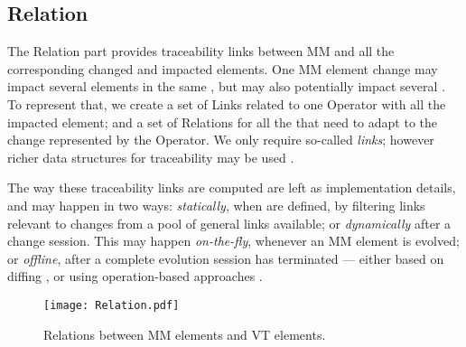 \subsection{Relation}
\label{sec:Suggestion:Relation}

The \textsf{Relation} part provides traceability links between \textsf{MM}
and all the corresponding \textsf{changed} and \textsf{impacted} elements.
One \textsf{MM} element change may impact several elements in the same \viewtype,
but may also potentially impact several \viewtypes. To represent that, we create
a set of \textsf{Link}s related to one \textsf{Operator} with all the \textsf{impacted}
\viewtype element; and a set of \textsf{Relation}s for all the \viewtypes that 
need to adapt to the change represented by the \textsf{Operator}.
We only require so-called \emph{links}; however richer
data structures for traceability may be used \cite{Batot-Cabot-Gerard:2021}.

The way these traceability links are computed are left as implementation
details, and may happen in two ways: \emph{statically}, when \viewtypes are defined,
by filtering links relevant to changes from a pool of general links available;
or \emph{dynamically} after a change session. This may happen \emph{on-the-fly},
whenever an \textsf{MM} element is evolved; or \emph{offline},
after a complete evolution session has terminated --- either based on diffing 
\cite{Kehrer-Kelter-Taentzer:2011}, or using operation-based approaches \cite{J:Lippe-Oosterom:1992}.

\begin{figure}[t]
    \centering
    \texttt{[image: Relation.pdf]}
    \caption{\textsf{Relation}s between \textsf{MM} elements and \textsf{VT} elements.}
    \label{fig:Relation}
\end{figure}

